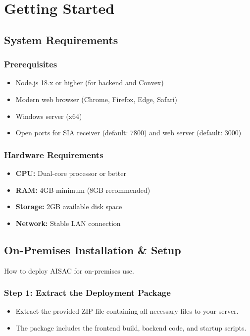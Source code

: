 \documentclass[12pt,a4paper]{article}
\begin{document}
\section{Getting Started}

\subsection{System Requirements}

\subsubsection{Prerequisites}
\begin{itemize}
\item Node.js 18.x or higher (for backend and Convex)
\item Modern web browser (Chrome, Firefox, Edge, Safari)
\item Windows server (x64)
\item Open ports for SIA receiver (default: 7800) and web server (default: 3000)
\end{itemize}

\subsubsection{Hardware Requirements}
\begin{itemize}
\item \textbf{CPU:} Dual-core processor or better
\item \textbf{RAM:} 4GB minimum (8GB recommended)
\item \textbf{Storage:} 2GB available disk space
\item \textbf{Network:} Stable LAN connection
\end{itemize}

\subsection{On-Premises Installation \& Setup}

How to deploy AISAC for on-premises use.

\subsubsection{Step 1: Extract the Deployment Package}
\begin{itemize}
\item Extract the provided ZIP file containing all necessary files to your server.
\item The package includes the frontend build, backend code, and startup scripts.
\end{itemize}
\end{document}
